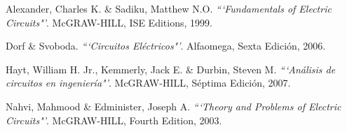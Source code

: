 \documentclass[twocolumn]{IEEEtran}
\begin{document}

\begin{thebibliography}{99}
 Alexander, Charles K. \&  Sadiku, Matthew N.O.
{\em ```Fundamentals of Electric Circuits"'}.
McGRAW-HILL, ISE Editions, 1999.

 Dorf  \& Svoboda.
{\em ```Circuitos Eléctricos"'}.
Alfaomega, Sexta Edición, 2006.

 Hayt, William H. Jr., Kemmerly, Jack E. \& Durbin, Steven M.
{\em ```Análisis de circuitos en ingeniería"'}.
McGRAW-HILL, Séptima Edición, 2007.

 Nahvi, Mahmood \& Edminister, Joseph A.
{\em ```Theory and Problems of Electric Circuits"'}.
McGRAW-HILL, Fourth Edition, 2003.

\end{thebibliography}
\end{document}
